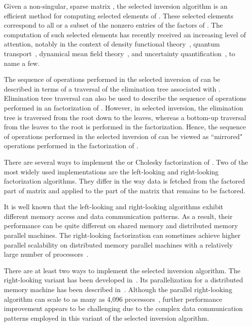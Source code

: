 \documentclass[10pt, conference, compsocconf,letterpaper,twocolumn]{IEEEtran}
\begin{document}
Given a non-singular, sparse matrix , the selected inversion algorithm is an efficient method for computing selected elements of . These selected elements correspond to all or a subset of the nonzero entries of the  factors of . The computation of such selected elements has recently received an increasing level of attention, notably in the context of density functional theory~\cite{HohenbergKohn1964,KohnSham1965,LinLuYingCarE2009,LinChenYangEtAl2013}, quantum transport~\cite{LiAhmedKlimeckDarve2008,LiWuDarve2013}, dynamical mean field theory~\cite{KotliarSavrasovHauleEtAl2006,TangSaad2012}, and uncertainty quantification~\cite{BekasCurioniFedulova2009}, to name a few. 

The sequence of operations performed in the selected inversion of  can be 
described in terms of a traversal of the elimination tree associated with
. Elimination tree traversal can also be used to describe the sequence of 
operations performed in an  factorization of . However, in selected 
inversion, the elimination tree is traversed from the root down to the leaves, 
whereas a bottom-up traversal from the leaves to the root is performed
in the  factorization. Hence, the sequence of operations performed
in the selected inversion of  can be viewed as ``mirrored" operations 
performed in the  factorization of . 



There are several ways to implement the  or Cholesky factorization of . 
Two of the most widely used implementations are the left-looking and 
right-looking factorization algorithms. 
They differ in the way data is fetched from the factored part of matrix 
and applied to the part of the matrix that remains to be factored.





It is well known that the left-looking and right-looking algorithms 
exhibit different  memory access and data communication patterns. 
As a result, their performance can be quite different on shared memory 
and distributed memory parallel machines. The right-looking  
factorization can sometimes achieve higher parallel scalability 
on distributed memory parallel machines with a relatively large number 
of processors~\cite{LiDemmel2003,YamazakiLi2012}.  

There are at least two ways to implement the selected inversion algorithm. The right-looking variant has been developed in~\cite{LinYangMezaEtAl2011}. 
Its parallelization for a distributed memory machine has been  
described in~\cite{JacquelinLinYang2015}.  Although the parallel right-looking 
algorithm can scale to as many as 4,096 processors~\cite{JacquelinLinWichmannEtAl2015},
further performance improvement appears to be challenging
due to the complex data communication patterns employed in this
variant of the selected inversion algorithm.
\end{document}
